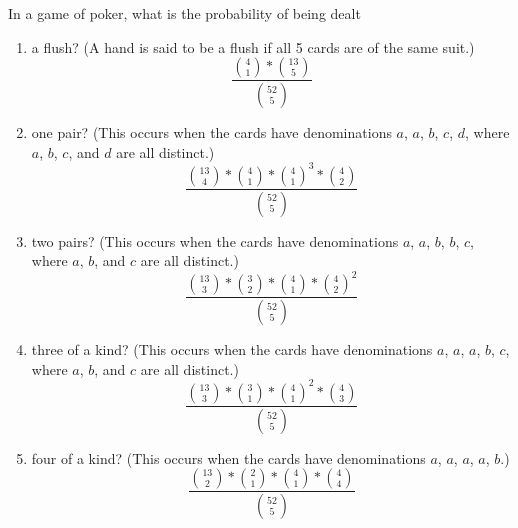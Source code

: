 \item In a game of poker, what is the probability of being dealt
\begin{enumerate}
    \item a flush? (A hand is said to be a flush if all 5 cards are of the same suit.)
    \[ \frac{\binom{4}{1} * \binom{13}{5}}{\binom{52}{5}} \]
    \item one pair? (This occurs when the cards have denominations $a$, $a$, $b$, $c$, $d$, where $a$, $b$, $c$, and $d$ are all distinct.)
    \[ \frac{\binom{13}{4} * \binom{4}{1} * \binom{4}{1}^3 * \binom{4}{2}}{\binom{52}{5}} \]
    \item two pairs? (This occurs when the cards have denominations $a$, $a$, $b$, $b$, $c$, where $a$, $b$, and $c$ are all distinct.)
    \[ \frac{\binom{13}{3} * \binom{3}{2} * \binom{4}{1} * \binom{4}{2}^2}{\binom{52}{5}} \]
    \item three of a kind? (This occurs when the cards have denominations $a$, $a$, $a$, $b$, $c$, where $a$, $b$, and $c$ are all distinct.)
    \[ \frac{\binom{13}{3} * \binom{3}{1} * \binom{4}{1}^2 * \binom{4}{3}}{\binom{52}{5}} \]
    \item four of a kind? (This occurs when the cards have denominations $a$, $a$, $a$, $a$, $b$.)
    \[ \frac{\binom{13}{2} * \binom{2}{1} * \binom{4}{1} * \binom{4}{4}}{\binom{52}{5}} \]
\end{enumerate}